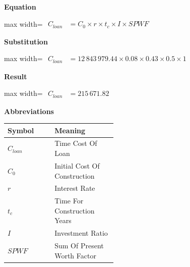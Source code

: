 \documentclass{article}
\begin{document}
\vspace{0.4em}
\textbf{Equation}\par\vspace{-0.35em}
\begin{center}
\begin{adjustbox}{max width=\linewidth}
$\displaystyle\begin{aligned}
C_{loan} &= C_0 \times r \times t_c \times I \times SPWF
\end{aligned}$
\end{adjustbox}
\end{center}
\vspace{0.4em}
\textbf{Substitution}\par\vspace{-0.35em}
\begin{center}
\begin{adjustbox}{max width=\linewidth}
$\displaystyle\begin{aligned}
C_{loan} &= 12\,843\,979.44 \times 0.08 \times 0.43 \times 0.5 \times 1
\end{aligned}$
\end{adjustbox}
\end{center}
\vspace{0.4em}
\textbf{Result}\par\vspace{-0.35em}
\begin{center}
\begin{adjustbox}{max width=\linewidth}
$\displaystyle\begin{aligned}
C_{loan} &= 215\,671.82
\end{aligned}$
\end{adjustbox}
\end{center}
\vspace{0.4em}
\textbf{Abbreviations}\par\vspace{-0.35em}
\begin{tabularx}{\linewidth}{>{\raggedright\arraybackslash}p{0.43\linewidth} >{\raggedright\arraybackslash}X}
\toprule
Symbol & Meaning \\
\midrule
$C_{loan}$ & Time Cost Of Loan \\
$C_0$ & Initial Cost Of Construction \\
$r$ & Interest Rate \\
$t_c$ & Time For Construction Years \\
$I$ & Investment Ratio \\
$SPWF$ & Sum Of Present Worth Factor \\
\bottomrule
\end{tabularx}
\end{document}
